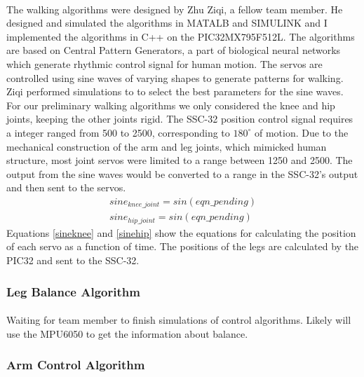 \documentclass[letterpaper,12pt]{article}
\begin{document}
\paragraph{} The walking algorithms were designed by Zhu Ziqi, a fellow team
member. He designed and simulated the algorithms in MATALB and SIMULINK and I
implemented the algorithms in C++ on the PIC32MX795F512L. The algorithms are
based on Central Pattern Generators, a part of biological neural networks which
generate rhythmic control signal for human motion\cite{cpggeneral}. The servos
are controlled using sine waves of varying shapes to generate patterns for
walking. Ziqi performed simulations to to select the best parameters for the
sine waves. For our preliminary walking algorithms we only considered the knee
and hip joints, keeping the other joints rigid. The SSC-32 position control
signal requires a integer ranged from 500 to 2500, corresponding to
$180^{\circ}$ of motion\cite{sscdata}. Due to the mechanical construction of the
arm and leg joints, which mimicked human structure, most joint servos were
limited to a range between 1250 and 2500. The output from the sine waves would
be converted to a range in the SSC-32's output and then sent to the servos. 
\begin{align}
    sine_{knee\_joint}=sin(eqn\_pending) \label{sineknee}\\
    sine_{hip\_joint}=sin(eqn\_pending) \label{sinehip}
\end{align}
Equations \ref{sineknee} and \ref{sinehip} show the equations for calculating
the position of each servo as a function of time. The positions of the legs are
calculated by the PIC32 and sent to the SSC-32.

\subsubsection{Leg Balance Algorithm}
\paragraph{} Waiting for team member to finish simulations of control
algorithms. Likely will use the MPU6050 to get the information about balance.

\subsubsection{Arm Control Algorithm}
\end{document}
